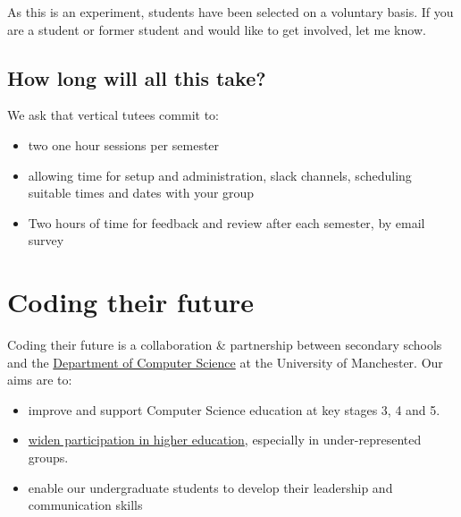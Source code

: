 \documentclass[
  12pt,
]{book}
\providecommand{\tightlist}{%
  \setlength{\itemsep}{0pt}\setlength{\parskip}{0pt}}
\begin{document}
As this is an experiment, students have been selected on a voluntary basis. If you are a student or former student and would like to get involved, let me know.

\hypertarget{howlong}{%
\section{How long will all this take?}\label{howlong}}

We ask that vertical tutees commit to:

\begin{itemize}
\tightlist
\item
  two one hour sessions per semester
\item
  allowing time for setup and administration, slack channels, scheduling suitable times and dates with your group
\item
  Two hours of time for feedback and review after each semester, by email survey
\end{itemize}

\hypertarget{coding-their-future}{%
\chapter{Coding their future}\label{coding-their-future}}

Coding their future is a collaboration \& partnership between secondary schools and the \href{https://www.cs.manchester.ac.uk/}{Department of Computer Science} at the University of Manchester. Our aims are to:

\begin{itemize}
\tightlist
\item
  improve and support Computer Science education at key stages 3, 4 and 5. \citep{shutdownrestart, afterthereboot, cse, cambridgegcse}
\item
  \href{https://www.manchester.ac.uk/discover/social-responsibility/widening-participation/}{widen participation in higher education}, especially in under-represented groups. \citep{wideningparticipation, classceiling, nicebutdim, breakintoelite}
\item
  enable our undergraduate students to develop their leadership and communication skills
\end{itemize}
\end{document}
